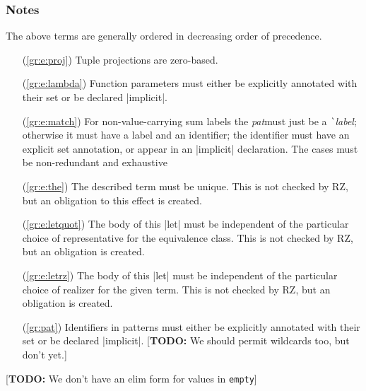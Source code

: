 \documentclass[11pt]{article}
\newcommand{\metav}[1]{\mbox{\textit{#1}}}
\newcommand{\Label}{\metav{\texttt{\`}label}}
\newcommand{\Pat}{\metav{pat}}
\newcommand{\TODO}[1]{[\textbf{TODO: }#1]}
\begin{document}
\subsubsection*{Notes}
The above terms are generally ordered in decreasing order of precedence. 

\begin{itemize}
	\item[(\ref{gr:e:proj})] Tuple projections are zero-based.
	\item[(\ref{gr:e:lambda})] Function parameters must either be explicitly annotated with their set or be declared |implicit|.
	\item[(\ref{gr:e:match})]
  For non-value-carrying
  sum labels the \Pat must just be a \Label; otherwise it must have a label and an identifier; the identifier must have an explicit set annotation, or appear in an |implicit| declaration.  The cases must be non-redundant
  and exhaustive
	\item[(\ref{gr:e:the})] The described term must be unique.  This is not checked by RZ, but an obligation to this effect is created. 
	\item[(\ref{gr:e:letquot})] The body of this |let| must be independent of the particular choice of representative for the equivalence class.  This is not checked by RZ, but an obligation is created.
	\item[(\ref{gr:e:letrz})] The body of this |let| must be independent of the particular choice of realizer for the given term.  This is not checked by RZ, but an obligation is created.
	\item[(\ref{gr:pat})] Identifiers in patterns must either be explicitly annotated with their set or be declared |implicit|.
	\TODO{We should permit wildcards too, but don't yet.}
\end{itemize}

\TODO{We don't have an elim form for values in \texttt{empty}}
\end{document}
